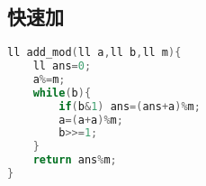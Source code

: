 \subsection{快速加}
		\begin{lstlisting}[language=c++]
ll add_mod(ll a,ll b,ll m){
	ll ans=0;
	a%=m;
	while(b){
		if(b&1) ans=(ans+a)%m;
		a=(a+a)%m;
		b>>=1;
	}
	return ans%m;
}
		\end{lstlisting}